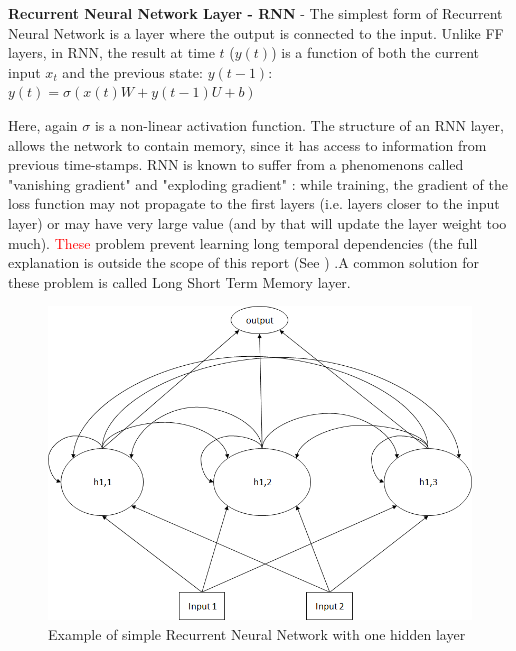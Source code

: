 \documentclass[
12pt, %
english, %
doublespacing, %
headsepline, %
]{MastersDoctoralThesis} %
\begin{document}
\textbf{Recurrent Neural Network Layer - RNN} - The simplest form of Recurrent Neural Network \cite{rumelhart1985learning, werbos1988generalization} is a layer where the output is connected to the input. Unlike FF layers, in RNN, the result at time $t$ ($y(t)$) is a function of both the current input $x_t$ and the previous state: 
$y(t-1)$:  
	$y\left( t \right) = \sigma \left( {x\left( t \right)W + y\left( {t - 1} \right)U + b} \right)$


Here, again $\sigma $ is a non-linear activation function. The structure of an RNN layer, allows the network to contain memory, since it has access to information from previous time-stamps. RNN is known to suffer from a  phenomenons called "vanishing gradient" and "exploding gradient" \cite{pascanu2013difficulty}: while training, the gradient of the loss function may not propagate to the first layers (i.e. layers closer to the input layer) or may have very large value (and by that will update the layer weight too much). \textcolor{red}{These} problem prevent learning long temporal dependencies (the full explanation is outside the scope of this report (See \cite{bengio1994learning}) .A common solution for these problem is called Long Short Term Memory layer.



\begin{figure}
	\centering
	\includegraphics[width=0.7\linewidth]{Figures/RNN_Example}
	\caption{Example of simple Recurrent Neural Network with one hidden layer}
	\label{fig:RNN_Example}
\end{figure}
\end{document}
